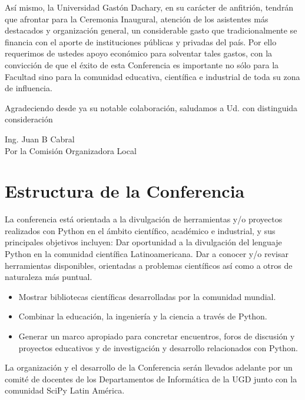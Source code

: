 \documentclass[11pt,a4paper]{report}
\begin{document}
Así mismo, la Universidad Gastón Dachary,  en su carácter de
anfitrión, tendrán que afrontar para la Ceremonia Inaugural, atención
de los asistentes más destacados y organización general, un
considerable gasto que tradicionalmente se financia con el aporte de
instituciones públicas y privadas del país. Por ello requerimos de
ustedes apoyo económico para solventar tales gastos, con la convicción
de que el éxito de esta Conferencia es importante no sólo para la
Facultad sino para la comunidad educativa, científica e industrial de
toda su zona de influencia.

Agradeciendo desde ya su notable colaboración, saludamos a Ud.
con distinguida consideración\\[0.5cm]



\begin{flushright}
Ing. Juan B Cabral\\
Por la Comisión Organizadora Local \\

\end{flushright}
\newpage
\section*{Estructura de la Conferencia}

    La conferencia está orientada a la divulgación de herramientas y/o
    proyectos realizados con Python en el ámbito científico, académico e
    industrial, y sus principales objetivos incluyen: Dar oportunidad a la
    divulgación del lenguaje Python en la comunidad científica Latinoamericana.
    Dar a conocer y/o revisar herramientas disponibles, orientadas a problemas
    científicos así como a otros de naturaleza más puntual.
  \begin{itemize}
    \item Mostrar bibliotecas científicas desarrolladas por la comunidad mundial.
    \item Combinar la educación, la ingeniería y la ciencia a través de Python.
    \item Generar un marco apropiado para concretar encuentros, foros de discusión y proyectos educativos y de investigación y desarrollo relacionados con Python.
  \end{itemize}
La organización y el desarrollo de la Conferencia serán llevados adelante
por un comité de docentes de los Departamentos de Informática de la UGD junto
con la comunidad SciPy Latin América.
\end{document}
